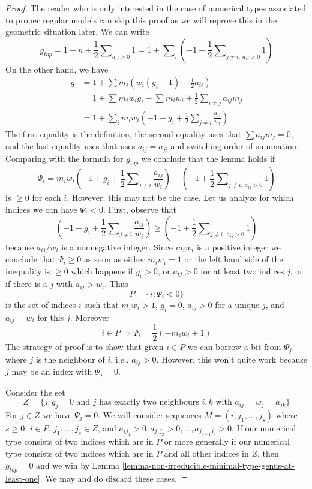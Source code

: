 \begin{proof}
The reader who is only interested in the case of numerical types
associated to proper regular models can skip this proof as we will
reprove this in the geometric situation later.
We can write
$$
g_{top} = 1 - n + \frac{1}{2}\sum\nolimits_{a_{ij} > 0} 1 =
1 + \sum\nolimits_i (-1 +
\frac{1}{2}\sum\nolimits_{j \not = i,\ a_{ij} > 0} 1) 
$$
On the other hand, we have
\begin{align*}
g & =
1 + \sum m_i(w_i(g_i - 1) - \frac{1}{2} a_{ii}) \\
& =
1 + \sum m_iw_ig_i - \sum m_iw_i +
\frac{1}{2} \sum\nolimits_{i \not = j} a_{ij}m_j \\
& =
1 + \sum\nolimits_i
m_iw_i(-1 + g_i + \frac{1}{2} \sum\nolimits_{j \not = i} \frac{a_{ij}}{w_i})
\end{align*}
The first equality is the definition, the second equality uses that
$\sum a_{ij}m_j = 0$, and the last equality uses that
uses $a_{ij} = a_{ji}$ and switching order of
summation. Comparing with the formula for $g_{top}$ we conclude
that the lemma holds if
$$
\Psi_i =
m_iw_i(-1 + g_i + \frac{1}{2} \sum\nolimits_{j \not = i} \frac{a_{ij}}{w_i})
- (-1 + \frac{1}{2}\sum\nolimits_{j \not = i,\ a_{ij} > 0} 1)
$$
is $\geq 0$ for each $i$. However, this may not be the case.
Let us analyze for which indices we can have $\Psi_i < 0$.
First, observe that
$$
(-1 + g_i + \frac{1}{2}\sum\nolimits_{j \not = i} \frac{a_{ij}}{w_i}) \geq
(-1 + \frac{1}{2}\sum\nolimits_{j \not = i,\ a_{ij} > 0} 1)
$$
because $a_{ij}/w_i$ is a nonnegative integer. Since $m_iw_i$ is
a positive integer we conclude that $\Psi_i \geq 0$ as soon as
either $m_iw_i = 1$ or the left hand side of the inequality is $\geq 0$
which happens if $g_i > 0$, or $a_{ij} > 0$ for at least two indices $j$, or
if there is a $j$ with $a_{ij} > w_i$. Thus
$$
P = \{i : \Psi_i < 0\}
$$
is the set of indices $i$ such that $m_iw_i > 1$, $g_i = 0$,
$a_{ij} > 0$ for a unique $j$, and $a_{ij} = w_i$ for this $j$.
Moreover
$$
i \in P \Rightarrow \Psi_i = \frac{1}{2}(-m_iw_i + 1)
$$
The strategy of proof is to show that given $i \in P$ we can borrow a bit
from $\Psi_j$ where $j$ is the neighbour of $i$, i.e., $a_{ij} > 0$.
However, this won't quite work because $j$ may be an index with $\Psi_j = 0$.

\medskip\noindent
Consider the set
$$
Z = \{j : g_j = 0\text{ and }
j\text{ has exactly two neighbours }i, k\text{ with }
a_{ij} = w_j = a_{jk}\}
$$
For $j \in Z$ we have $\Psi_j = 0$. We will consider sequences
$M = (i, j_1, \ldots, j_s)$ where $s \geq 0$,
$i \in P$, $j_1, \ldots, j_s \in Z$, and
$a_{ij_1} > 0, a_{j_1j_2} > 0, \ldots, a_{j_{s - 1}j_s} > 0$.
If our numerical type consists of two indices which are in $P$
or more generally if our numerical type consists of
two indices which are in $P$ and all other indices in $Z$, then
$g_{top} = 0$ and we win by
Lemma \ref{lemma-non-irreducible-minimal-type-genus-at-least-one}.
We may and do discard these cases.


\end{proof}
